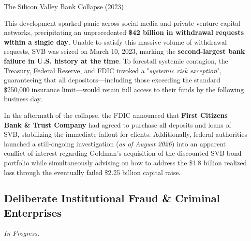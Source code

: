 \documentclass[10pt]{article}
\begin{document}
\begin{core}[label=core:svb_collapse]{The Silicon Valley Bank Collapse (2023)}
\begin{itemize}
      \end{itemize}

      This development sparked panic across social media and private venture capital networks, precipitating an unprecedented \textbf{\$42 billion in withdrawal requests within a single day}. Unable to satisfy this massive volume of withdrawal requests, SVB was seized on March 10, 2023, marking the \textbf{second-largest bank failure in U.S. history at the time}. To forestall systemic contagion, the Treasury, Federal Reserve, and FDIC invoked a "\textit{systemic risk exception}", guaranteeing that all depositors---including those exceeding the standard \$250,000 insurance limit---would retain full access to their funds by the following business day.

      In the aftermath of the collapse, the FDIC announced that \textbf{First Citizens Bank \& Trust Company} had agreed to purchase all deposits and loans of SVB, stabilizing the immediate fallout for clients. Additionally, federal authorities launched a still-ongoing investigation (\textit{as of August 2026}) into an apparent conflict of interest regarding Goldman's acquisition of the discounted SVB bond portfolio while simultaneously advising on how to address the \$1.8 billion realized loss through the eventually failed \$2.25 billion capital raise.

    \end{core}

  \subsection{Deliberate Institutional Fraud \& Criminal Enterprises}

    \textit{In Progress.}




\end{document}
